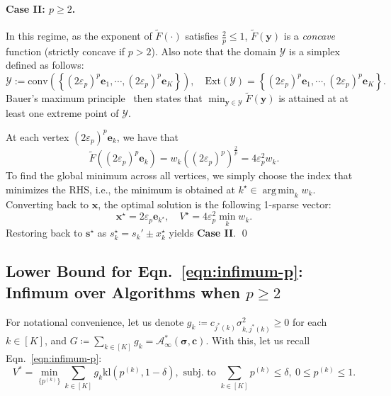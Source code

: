 \documentclass{article}
\def\vc{{\bm{c}}}
\def\ve{{\bm{e}}}
\def\vs{{\bm{s}}}
\def\vx{{\bm{x}}}
\def\vy{{\bm{y}}}
\def\gA{{\mathcal{A}}}
\def\gY{{\mathcal{Y}}}
\newcommand{\kl}{\mathrm{kl}}
\DeclareMathOperator*{\argmin}{arg\,min}
\theoremstyle{plain}
\theoremstyle{definition}
\theoremstyle{plain}
\begin{document}
\paragraph{Case II: $p \geq 2$.}
In this regime, as the exponent of $\widetilde{F}(\cdot)$ satisfies $\frac{2}{p} \leq 1$, $\widetilde{F}(\vy)$ is a \emph{concave} function (strictly concave if $p > 2$).
Also note that the domain $\gY$ is a simplex defined as follows:
\begin{equation}
    \gY := \mathrm{conv}\left( \left\{ (2\varepsilon_p)^p \ve_1, \cdots, (2\varepsilon_p)^p \ve_K \right\} \right), \quad \mathrm{Ext}(\gY) = \left\{ (2\varepsilon_p)^p \ve_1, \cdots, (2\varepsilon_p)^p \ve_K \right\}.
\end{equation}
Bauer's maximum principle~\citep{bauer1958maximum} then states that $\min_{\vy \in \gY} \widetilde{F}(\vy)$ is attained at at least one extreme point of $\gY$.

At each vertex $(2\varepsilon_p)^p \ve_k$, we have that
\begin{equation}
    \tilde{F}\left( (2\varepsilon_p)^p \ve_k \right) = w_k \left( (2\varepsilon_p)^p \right)^{\frac{2}{p}} = 4 \varepsilon_p^2 w_k.
\end{equation}
To find the global minimum across all vertices, we simply choose the index that minimizes the RHS, i.e., the minimum is obtained at $k^\star \in \argmin_k w_k$.
Converting back to $\vx$, the optimal solution is the following 1-sparse vector:
\begin{equation}
    \vx^\star = 2\varepsilon_p \ve_{k^\star}, \quad V^\star = 4 \varepsilon_p^2 \min_k w_k.
\end{equation}
Restoring back to $\vs^\star$ as $s^\star_k = s_k' \pm x_k^\star$ yields \textbf{Case II}.
\qed


\subsection{\texorpdfstring{Lower Bound for Eqn.~\eqref{eqn:infimum-p}: Infimum over Algorithms when $p \geq 2$}{Lower Bound for Eqn. (3): Infimum over Algorithms when p is greater than or equal to 2}}
\label{app:infimum-p}

For notational convenience, let us denote $g_k \coloneq c_{j^*(k)} \sigma_{k,j^*(k)}^2 \geq 0$ for each $k \in [K]$, and $G \coloneq \sum_{k \in [K]} g_k = \gA_\infty^*(\bm\sigma, \vc)$.
With this, let us recall Eqn.~\eqref{eqn:infimum-p}:
\begin{equation}
    V^* = \min_{\{p^{(k)}\}} \sum_{k \in [K]} g_k \kl(p^{(k)}, 1 - \delta), \text{ subj. to } \sum_{k \in [K]} p^{(k)} \leq \delta, \ 0 \leq p^{(k)} \leq 1.
\end{equation}
\end{document}
